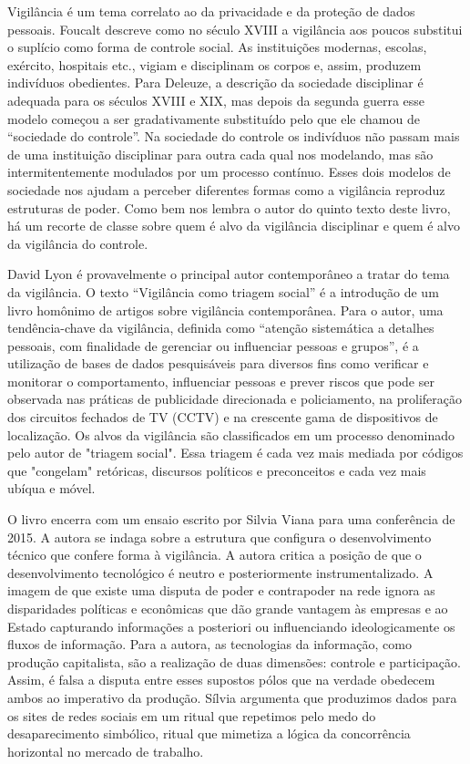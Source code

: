 Vigilância é um tema correlato ao da privacidade e da proteção de dados
pessoais. Foucalt descreve como no século XVIII a vigilância aos poucos
substitui o suplício como forma de controle social. As instituições
modernas, escolas, exército, hospitais etc., vigiam e disciplinam os
corpos e, assim, produzem indivíduos obedientes. Para Deleuze, a
descrição da sociedade disciplinar é adequada para os séculos XVIII e
XIX, mas depois da segunda guerra esse modelo começou a ser
gradativamente substituído pelo que ele chamou de ``sociedade do
controle''. Na sociedade do controle os indivíduos não passam mais de
uma instituição disciplinar para outra cada qual nos modelando, mas são
intermitentemente modulados por um processo contínuo. Esses dois modelos
de sociedade nos ajudam a perceber diferentes formas como a vigilância
reproduz estruturas de poder. Como bem nos lembra o autor do quinto
texto deste livro, há um recorte de classe sobre quem é alvo da
vigilância disciplinar e quem é alvo da vigilância do controle.

David Lyon é provavelmente o principal autor contemporâneo a tratar do
tema da vigilância. O texto ``Vigilância como triagem social'' é a
introdução de um livro homônimo de artigos sobre vigilância
contemporânea. Para o autor, uma tendência-chave da vigilância, definida
como ``atenção sistemática a detalhes pessoais, com finalidade de
gerenciar ou influenciar pessoas e grupos'', é a utilização de bases de
dados pesquisáveis para diversos fins como verificar e monitorar o
comportamento, influenciar pessoas e prever riscos que pode ser
observada nas práticas de publicidade direcionada e policiamento, na
proliferação dos circuitos fechados de TV (CCTV) e na crescente gama de
dispositivos de localização. Os alvos da vigilância são classificados em
um processo denominado pelo autor de "triagem social". Essa triagem é
cada vez mais mediada por códigos que "congelam" retóricas, discursos
políticos e preconceitos e cada vez mais ubíqua e móvel.

O livro encerra com um ensaio escrito por Silvia Viana para uma
conferência de 2015. A autora se indaga sobre a estrutura que configura
o desenvolvimento técnico que confere forma à vigilância. A autora
critica a posição de que o desenvolvimento tecnológico é neutro e
posteriormente instrumentalizado. A imagem de que existe uma disputa de
poder e contrapoder na rede ignora as disparidades políticas e
econômicas que dão grande vantagem às empresas e ao Estado capturando
informações a posteriori ou influenciando ideologicamente os fluxos de
informação. Para a autora, as tecnologias da informação, como produção
capitalista, são a realização de duas dimensões: controle e
participação. Assim, é falsa a disputa entre esses supostos pólos que na
verdade obedecem ambos ao imperativo da produção. Sílvia argumenta que
produzimos dados para os sites de redes sociais em um ritual que
repetimos pelo medo do desaparecimento simbólico, ritual que mimetiza a
lógica da concorrência horizontal no mercado de trabalho.

